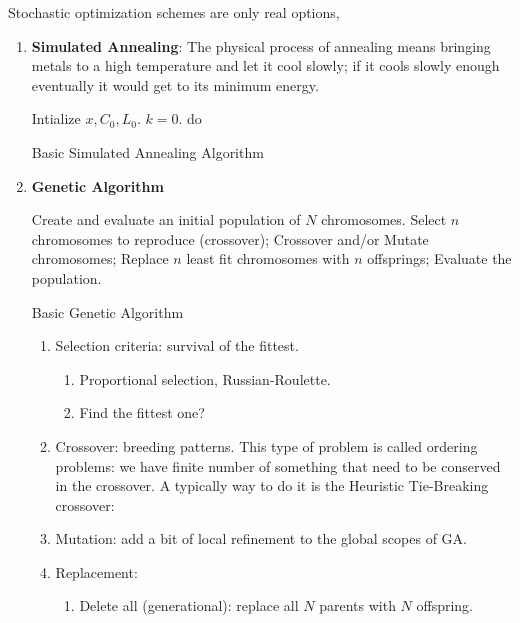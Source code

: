\documentclass{school-22.211-notes}
\begin{document}
Stochastic optimization schemes are only real options, 

\begin{enumerate}
\item \textbf{Simulated Annealing}: The physical process of annealing
  means bringing metals to a high temperature and let it cool slowly;
  if it cools slowly enough eventually it would get to its minimum
  energy.

\begin{algorithm}
  \begin{algorithmic}
    \STATE Intialize $x, C_0, L_0$.  $k=0$. 
    \STATE do 
    \ENDWHILE
  \end{algorithmic}
  \caption{Basic Simulated Annealing Algorithm} 
\end{algorithm}

\item \textbf{Genetic Algorithm}
  \begin{algorithm}
    \begin{algorithmic}
      \STATE Create and evaluate an initial population of $N$ chromosomes.
      \STATE Select $n$ chromosomes to reproduce (crossover); 
      \STATE Crossover and/or Mutate chromosomes;
      \STATE Replace $n$ least fit chromosomes with $n$ offsprings;
      \STATE Evaluate the population.
      \ENDWHILE
    \end{algorithmic}
    \caption{Basic Genetic Algorithm}
  \end{algorithm}

  \begin{enumerate}
  \item  Selection criteria: survival of the fittest. 
    \begin{enumerate}
    \item Proportional selection, Russian-Roulette. 
    \item Find the fittest one? 
    \end{enumerate}

  \item Crossover: breeding patterns. This type of problem is called
    ordering problems: we have finite number of something that need to
    be conserved in the crossover. A typically way to do it is the
    Heuristic Tie-Breaking crossover:

  \item Mutation: add a bit of local refinement to the global scopes of GA. 

  \item Replacement: 
    \begin{enumerate}
    \item Delete all (generational): replace all $N$ parents with $N$
      offspring.  


\end{enumerate}
\end{enumerate}
\end{enumerate}
\end{document}
